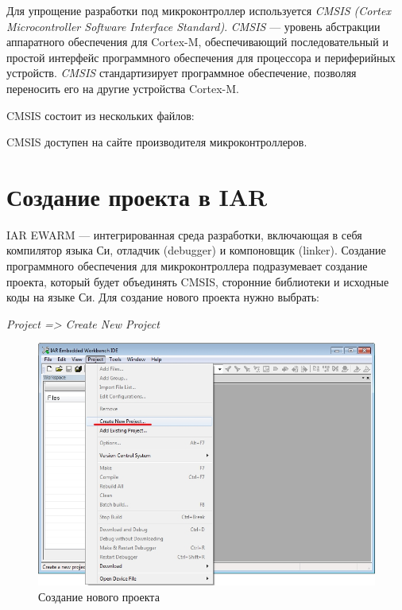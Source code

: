 Для упрощение разработки под микроконтроллер используется \textit{CMSIS (Cortex Microcontroller Software Interface Standard)}. \textit{CMSIS} --- уровень абстракции аппаратного обеспечения для Cortex-M, обеспечивающий последовательный и простой интерфейс программного обеспечения для процессора и периферийных устройств. \textit{CMSIS} стандартизирует программное обеспечение, позволяя переносить его на другие устройства Cortex-M. 

CMSIS состоит из нескольких файлов:

CMSIS доступен на сайте производителя микроконтроллеров.


\section{Создание проекта в IAR}

IAR EWARM --- интегрированная среда разработки, включающая в себя компилятор языка Си, отладчик (debugger) и компоновщик (linker). Создание программного обеспечения для микроконтроллера подразумевает создание проекта, который будет объединять CMSIS, сторонние библиотеки и исходные коды на языке Си. Для создание нового проекта нужно выбрать:
\begin{center}
\textit{Project => Create New Project}
\end{center}


\begin{figure}[h!]
\begin{center}
\includegraphics[scale=0.5]{Image/4_1}
\end{center}
\caption{Создание нового проекта}
\end{figure}

